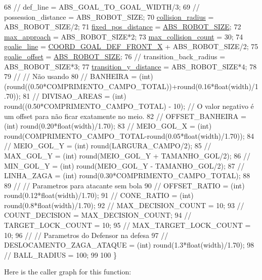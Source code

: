 \begin{DoxyCode}
68     \textcolor{comment}{// def\_line = ABS\_GOAL\_TO\_GOAL\_WIDTH/3;}
69     \textcolor{comment}{// possession\_distance = ABS\_ROBOT\_SIZE;}
70     \hyperlink{namespace_c_o_n_s_t_a793c8da95030a92162ffac2d4dbe7a27}{collision\_radius} = ABS\_ROBOT\_SIZE/2;
71     \hyperlink{namespace_c_o_n_s_t_ae8d764cbcf03a0351752bff7d9cb30e6}{fixed\_pos\_distance} = \hyperlink{namespace_c_o_n_s_t_a8d0d7fe4341b9129cabd565ef16a0640}{ABS\_ROBOT\_SIZE};
72     \hyperlink{namespace_c_o_n_s_t_ae2d0cdffa1b71008198e4f7455a5d17e}{max\_approach} = ABS\_ROBOT\_SIZE*2;
73     \hyperlink{namespace_c_o_n_s_t_ac842498e6a58e8876f03a854fc407ca4}{max\_collision\_count} = 30;
74     \hyperlink{namespace_c_o_n_s_t_a0091cb614eeaed41acd8997e9f9c9c0c}{goalie\_line} = \hyperlink{namespace_c_o_n_s_t_a0337e257371474864833c9d72e5295e4}{COORD\_GOAL\_DEF\_FRONT\_X} + ABS\_ROBOT\_SIZE/2;
75     \hyperlink{namespace_c_o_n_s_t_a75c38666c7edbca23d10a3fc651865a4}{goalie\_offset} = \hyperlink{namespace_c_o_n_s_t_a8d0d7fe4341b9129cabd565ef16a0640}{ABS\_ROBOT\_SIZE};
76     \textcolor{comment}{// transition\_back\_radius = ABS\_ROBOT\_SIZE*3;}
77     \hyperlink{namespace_c_o_n_s_t_a80cf517751f39b73463d8dbe63458266}{transition\_y\_distance} = ABS\_ROBOT\_SIZE*4;
78 
79     \textcolor{comment}{// // Não usando}
80     \textcolor{comment}{// BANHEIRA     =   (int) (round((0.50*COMPRIMENTO\_CAMPO\_TOTAL))+round(0.16*float(width)/1.70));}
81     \textcolor{comment}{// DIVISAO\_AREAS    =   (int) round((0.50*COMPRIMENTO\_CAMPO\_TOTAL) - 10); // O valor negativo é um
       offset para não ficar exatamente no meio.}
82     \textcolor{comment}{// OFFSET\_BANHEIRA  =   (int) round(0.20*float(width)/1.70);}
83     \textcolor{comment}{// MEIO\_GOL\_X       =   (int) round(COMPRIMENTO\_CAMPO\_TOTAL-round(0.05*float(width)/1.70));}
84     \textcolor{comment}{// MEIO\_GOL\_Y       =   (int) round(LARGURA\_CAMPO/2);}
85     \textcolor{comment}{// MAX\_GOL\_Y        =   (int) round(MEIO\_GOL\_Y + TAMANHO\_GOL/2);}
86     \textcolor{comment}{// MIN\_GOL\_Y        =   (int) round(MEIO\_GOL\_Y - TAMANHO\_GOL/2);}
87     \textcolor{comment}{// LINHA\_ZAGA       =   (int) round(0.30*COMPRIMENTO\_CAMPO\_TOTAL);}
88 
89     \textcolor{comment}{// // Parametros para atacante sem bola}
90     \textcolor{comment}{// OFFSET\_RATIO =   (int) round(0.12*float(width)/1.70);}
91     \textcolor{comment}{// CONE\_RATIO       =   (int) round(0.8*float(width)/1.70);}
92     \textcolor{comment}{// MAX\_DECISION\_COUNT = 10;}
93     \textcolor{comment}{// COUNT\_DECISION = MAX\_DECISION\_COUNT;}
94     \textcolor{comment}{// TARGET\_LOCK\_COUNT = 10;}
95     \textcolor{comment}{// MAX\_TARGET\_LOCK\_COUNT = 10;}
96     \textcolor{comment}{// // Parametros do Defensor na defesa}
97     \textcolor{comment}{// DESLOCAMENTO\_ZAGA\_ATAQUE =   (int) round(1.3*float(width)/1.70);}
98     \textcolor{comment}{// BALL\_RADIUS = 100;}
99 
100 \}
\end{DoxyCode}
Here is the caller graph for this function\+:
\mbox{\label{class_strategy_ad2a232eda7c95636be17a3d528547b5f}} 
